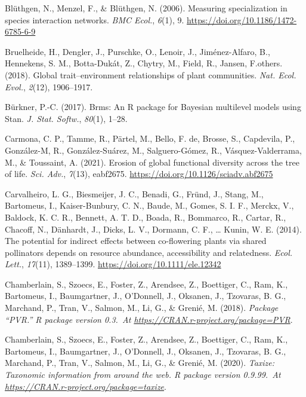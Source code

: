 \documentclass[
  12pt,
  a4paper,
]{article}
\newlength{\cslhangindent}
\newlength{\cslentryspacingunit} %
\newenvironment{CSLReferences}[2] %
 {%
  \setlength{\parindent}{0pt}
  \ifodd #1
  \let\oldpar\par
  \def\par{\hangindent=\cslhangindent\oldpar}
  \fi
  \setlength{\parskip}{#2\cslentryspacingunit}
 }%
 {}
\begin{document}
\begin{CSLReferences}{1}{0}
\leavevmode{}%
Blüthgen, N., Menzel, F., \& Blüthgen, N. (2006). Measuring specialization in species interaction networks. \emph{BMC Ecol.}, \emph{6}(1), 9. \url{https://doi.org/10.1186/1472-6785-6-9}

\leavevmode{}%
Bruelheide, H., Dengler, J., Purschke, O., Lenoir, J., Jiménez-Alfaro, B., Hennekens, S. M., Botta-Dukát, Z., Chytry, M., Field, R., Jansen, F.others. (2018). Global trait--environment relationships of plant communities. \emph{Nat. Ecol. Evol.}, \emph{2}(12), 1906--1917.

\leavevmode{}%
Bürkner, P.-C. (2017). Brms: {An R} package for {Bayesian} multilevel models using {Stan}. \emph{J. Stat. Softw.}, \emph{80}(1), 1--28.

\leavevmode{}%
Carmona, C. P., Tamme, R., Pärtel, M., Bello, F. de, Brosse, S., Capdevila, P., González-M, R., González-Suárez, M., Salguero-Gómez, R., Vásquez-Valderrama, M., \& Toussaint, A. (2021). Erosion of global functional diversity across the tree of life. \emph{Sci. Adv.}, \emph{7}(13), eabf2675. \url{https://doi.org/10.1126/sciadv.abf2675}

\leavevmode{}%
Carvalheiro, L. G., Biesmeijer, J. C., Benadi, G., Fründ, J., Stang, M., Bartomeus, I., Kaiser-Bunbury, C. N., Baude, M., Gomes, S. I. F., Merckx, V., Baldock, K. C. R., Bennett, A. T. D., Boada, R., Bommarco, R., Cartar, R., Chacoff, N., Dänhardt, J., Dicks, L. V., Dormann, C. F., \ldots{} Kunin, W. E. (2014). The potential for indirect effects between co-flowering plants via shared pollinators depends on resource abundance, accessibility and relatedness. \emph{Ecol. Lett.}, \emph{17}(11), 1389--1399. \url{https://doi.org/10.1111/ele.12342}

\leavevmode{}%
Chamberlain, S., Szoecs, E., Foster, Z., Arendsee, Z., Boettiger, C., Ram, K., Bartomeus, I., Baumgartner, J., O'Donnell, J., Oksanen, J., Tzovaras, B. G., Marchand, P., Tran, V., Salmon, M., Li, G., \& Grenié, M. (2018). \emph{Package {``{PVR}.''} R package version 0.3.~At \href{https://CRAN.R-project.org/package=PVR}{https://CRAN.r-project.org/package=PVR}}.

\leavevmode{}%
Chamberlain, S., Szoecs, E., Foster, Z., Arendsee, Z., Boettiger, C., Ram, K., Bartomeus, I., Baumgartner, J., O'Donnell, J., Oksanen, J., Tzovaras, B. G., Marchand, P., Tran, V., Salmon, M., Li, G., \& Grenié, M. (2020). \emph{Taxize: {Taxonomic} information from around the web. R package version 0.9.99.~At \href{https://CRAN.R-project.org/package=taxize}{https://CRAN.r-project.org/package=taxize}}.


\end{CSLReferences}
\end{document}
